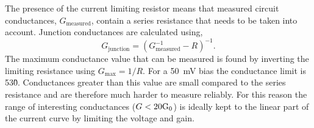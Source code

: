 \documentclass{article}
\begin{document}
The presence of the current limiting resistor means that measured circuit conductances, $G_{\mathrm{measured}}$, contain a series resistance that needs to be taken into account. Junction conductances are calculated using,
\begin{equation}
	G_{\mathrm{junction}} = \left(G_{\mathrm{measured}}^{-1} - R\right)^{-1}.
\end{equation}
The maximum conductance value that can be measured is found by inverting the limiting resistance using $G_{\mathrm{max}} = 1/R$. For a \SI{50}{mV} bias the conductance limit is 53\G0. Conductances greater than this value are small compared to the series resistance and are therefore much harder to measure reliably. For this reason the range of interesting conductances ($G<20\mathrm{G_{0}}$) is ideally kept to the linear part of the current curve by limiting the voltage and gain.

\FloatBarrier
\end{document}
